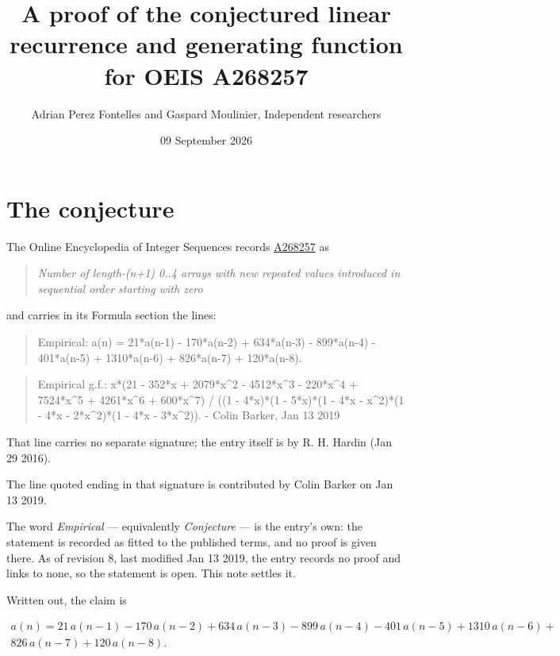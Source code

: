 \documentclass[11pt]{article}
\title{A proof of the conjectured linear recurrence and generating function for OEIS A268257}
\author{Adrian Perez Fontelles and Gaspard Moulinier, Independent researchers}
\date{09 September 2026}
\theoremstyle{definition}
\begin{document}
\maketitle
\section{The conjecture}

The Online Encyclopedia of Integer Sequences records \href{https://oeis.org/A268257}{A268257} as

\begin{quote}\itshape Number of length-(n+1) 0..4 arrays with new repeated values introduced in sequential order starting with zero\end{quote}

and carries in its Formula section the lines:

\begin{quote}\ttfamily Empirical: a(n) = 21*a(n-1) - 170*a(n-2) + 634*a(n-3) - 899*a(n-4) - 401*a(n-5) + 1310*a(n-6) + 826*a(n-7) + 120*a(n-8).\end{quote}

\begin{quote}\ttfamily Empirical g.f.: x*(21 - 352*x + 2079*x\textasciicircum{}2 - 4512*x\textasciicircum{}3 - 220*x\textasciicircum{}4 + 7524*x\textasciicircum{}5 + 4261*x\textasciicircum{}6 + 600*x\textasciicircum{}7) / ((1 - 4*x)*(1 - 5*x)*(1 - 4*x - x\textasciicircum{}2)*(1 - 4*x - 2*x\textasciicircum{}2)*(1 - 4*x - 3*x\textasciicircum{}2)). - Colin Barker, Jan 13 2019\end{quote}

That line carries no separate signature; the entry itself is by R. H. Hardin (Jan 29 2016).

The line quoted ending in that signature is contributed by Colin Barker on Jan 13 2019.

The word {\itshape Empirical} --- equivalently {\itshape Conjecture} --- is the entry's own: the statement is recorded as fitted to the published terms, and no proof is given there. As of revision 8, last modified Jan 13 2019, the entry records no proof and links to none, so the statement is open. This note settles it.

Written out, the claim is

\begin{multline*} a(n) = 21\,a(n-1) - 170\,a(n-2) + 634\,a(n-3) - 899\,a(n-4) - 401\,a(n-5) + 1310\,a(n-6) + \\ 826\,a(n-7) + 120\,a(n-8). \end{multline*}
\end{document}
